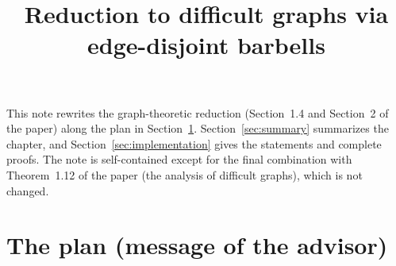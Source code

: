 \documentclass[11pt,a4paper]{article}
\title{Reduction to difficult graphs via edge-disjoint barbells}
\date{}
\theoremstyle{definition}
\theoremstyle{remark}
\theoremstyle{plain}
\theoremstyle{definition}
\begin{document}
\maketitle

\noindent This note rewrites the graph-theoretic reduction (Section~1.4 and
Section~2 of the paper) along the plan in Section~\ref{sec:message}.
Section~\ref{sec:summary} summarizes the chapter, and
Section~\ref{sec:implementation} gives the statements and complete proofs. The
note is self-contained except for the final combination with Theorem~1.12 of
the paper (the analysis of difficult graphs), which is not changed.

\setcounter{section}{-1}
\section{The plan (message of the advisor)}\label{sec:message}
\end{document}
